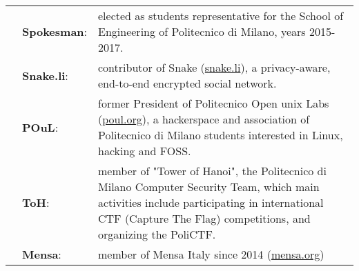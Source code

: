 \documentclass[a4paper,10pt]{article}
\begin{document}
\noindent
\large
\begin{tabularx}{\textwidth}{ C{0.5cm} L{3.1cm} *{1}{X}}
	& \textbf{Spokesman}: & elected as students representative for the School of Engineering of Politecnico di Milano, years 2015-2017. \vspace{2 mm}\\
	& \textbf{Snake.li}: & contributor of Snake (\href{https://snake.li}{snake.li}), a privacy-aware, end-to-end encrypted social network. \vspace{2 mm}\\
	& \textbf{POuL}: & former President of Politecnico Open unix Labs (\href{https://poul.org}{poul.org}), a hackerspace and association of Politecnico di Milano students interested in Linux, hacking and FOSS. \vspace{2 mm}\\
	& \textbf{ToH}: & member of "Tower of Hanoi", the Politecnico di Milano Computer Security Team, which main activities include participating in international CTF (Capture The Flag) competitions, and organizing the PoliCTF. \vspace{2 mm}\\
	& \textbf{Mensa}: & member of Mensa Italy since 2014 (\href{https://mensa.org}{mensa.org}) \vspace{2 mm}\\
\end{tabularx}
\end{document}
